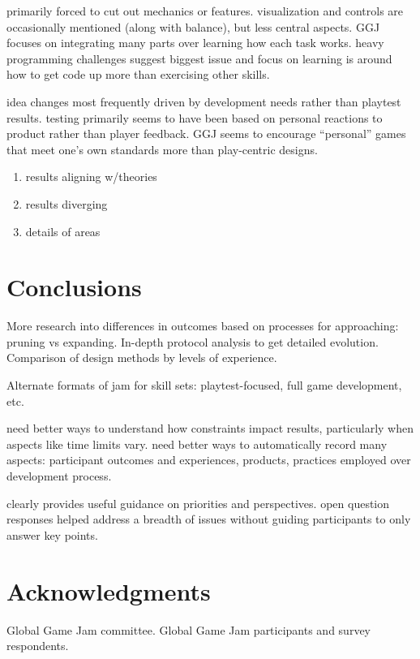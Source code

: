 \documentclass{sig-alternate}
\begin{document}
primarily forced to cut out mechanics or features. visualization and controls are occasionally mentioned (along with balance), but less central aspects. GGJ focuses on integrating many parts over learning how each task works. heavy programming challenges suggest biggest issue and focus on learning is around how to get code up more than exercising other skills.

idea changes most frequently driven by development needs rather than playtest results. testing primarily seems to have been based on personal reactions to product rather than player feedback. GGJ seems to encourage ``personal'' games that meet one's own standards more than play-centric designs. 

\begin{enumerate}
\item results aligning w/theories
\item results diverging
\item details of areas
\end{enumerate}

\section{Conclusions}
More research into differences in outcomes based on processes for approaching: pruning vs expanding. In-depth protocol analysis to get detailed evolution. Comparison of design methods by levels of experience.

Alternate formats of jam for skill sets: playtest-focused, full game development, etc.

need better ways to understand how constraints impact results, particularly when aspects like time limits vary. need better ways to automatically record many aspects: participant outcomes and experiences, products, practices employed over development process.

clearly provides useful guidance on priorities and perspectives. open question responses helped address a breadth of issues without guiding participants to only answer key points.

\section{Acknowledgments}
Global Game Jam committee. Global Game Jam participants and survey respondents.




\end{document}
